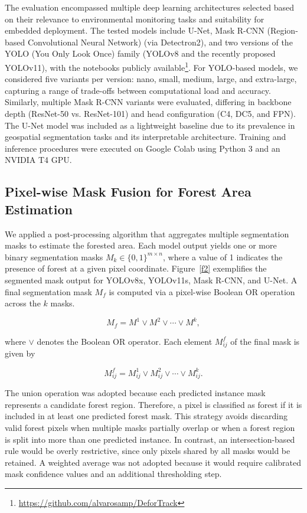 \documentclass[journal,article,submit,pdftex,moreauthors]{Definitions/mdpi}
\begin{document}
The evaluation encompassed multiple deep learning architectures selected based on their relevance to environmental monitoring tasks and suitability for embedded deployment. The tested models include U-Net, Mask R-CNN (Region-based Convolutional Neural Network) (via Detectron2), and two versions of the YOLO (You Only Look Once) family (YOLOv8 and the recently proposed YOLOv11), with the notebooks publicly available\footnote{\url{https://github.com/alvarosamp/DeforTrack}}. 
For YOLO-based models, we considered five variants per version: nano, small, medium, large, and extra-large, capturing a range of trade-offs between computational load and accuracy. Similarly, multiple Mask R-CNN variants were evaluated, differing in backbone depth (ResNet-50 vs. ResNet-101) and head configuration (C4, DC5, and FPN). The U-Net model was included as a lightweight baseline due to its prevalence in geospatial segmentation tasks and its interpretable architecture. Training and inference procedures were executed on Google Colab using Python 3 and an NVIDIA T4 GPU.

\subsection{Pixel-wise Mask Fusion for Forest Area Estimation}
\label{subsec:algorithm}

We applied a post-processing algorithm that aggregates multiple segmentation
masks to estimate the forested area. Each model output yields one or more binary
segmentation masks $M_k \in \{0,1\}^{m \times n}$, where a value of 1 indicates
the presence of forest at a given pixel coordinate. Figure~\ref{f2} exemplifies
the segmented mask output for YOLOv8x, YOLOv11s, Mask R-CNN, and U-Net. A final
segmentation mask $M_f$ is computed via a pixel-wise Boolean OR operation across
the $k$ masks.

\begin{equation}
    M_f = M^1 \lor M^2 \lor \cdots \lor M^k,
\end{equation}

where $\lor$ denotes the Boolean OR operator. Each element $M_{ij}^f$ of the
final mask is given by

\begin{equation}
M_{ij}^f = M_{ij}^1 \lor M_{ij}^2 \lor \cdots \lor M_{ij}^k.
\end{equation}

The union operation was adopted because each predicted instance mask represents
a candidate forest region. Therefore, a pixel is classified as forest if it is
included in at least one predicted forest mask. This strategy avoids discarding
valid forest pixels when multiple masks partially overlap or when a forest
region is split into more than one predicted instance. In contrast, an
intersection-based rule would be overly restrictive, since only pixels shared by
all masks would be retained. A weighted average was not adopted because it would
require calibrated mask confidence values and an additional thresholding step.
\end{document}
